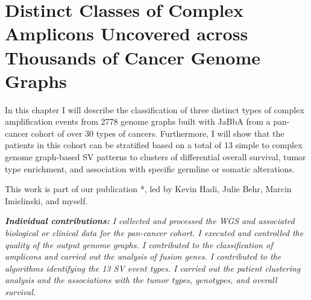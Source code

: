 \documentclass[phd,tocprelim]{cornell}
\begin{document}
\chapter{Distinct Classes of Complex Amplicons Uncovered across Thousands of Cancer Genome Graphs} \label{chap:complex_events}
In this chapter I will describe the classification of three distinct types of complex amplification events from 2778 genome graphs built with JaBbA from a pan-cancer cohort of over 30 types of cancers. Furthermore, I will show that the patients in this cohort can be stratified based on a total of 13 simple to complex genome graph-based SV patterns to clusters of differential overall survival, tumor type enrichment, and association with specific germline or somatic alterations.

This work is part of our publication \cite{Hadi2020-um}*, led by Kevin Hadi, Julie Behr, Marcin Imielinski, and myself.

\textit{
    \textbf{Individual contributions:} I collected and processed the WGS and associated biological or clinical data for the pan-cancer cohort. I executed and controlled the quality of the output genome graphs. I contributed to the classification of amplicons and carried out the analysis of fusion genes. I contributed to the algorithms identifying the 13 SV event types. I carried out the patient clustering analysis and the associations with the tumor types, genotypes, and overall survival.
}


\newpage
\end{document}
